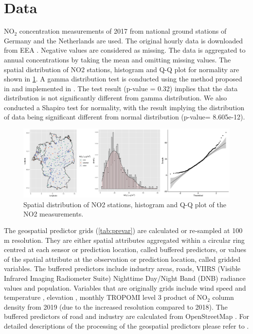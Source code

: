 \documentclass{article}
\begin{document}
 
 
\section{Data}
NO$_2$ concentration measurements of 2017 from national ground stations of Germany and the Netherlands are used. The original hourly data is downloaded from EEA \citep{EEA}. Negative values are considered as missing. The data is aggregated to annual concentrations by taking the mean and omitting missing values. The spatial distribution of NO2 stations, histogram and Q-Q plot for normality are shown in \cref{fig:histqq}. %
A gamma distribution test is conducted using the method proposed in \cite{villasenor2015variance} and implemented in \cite{goft}.  The test result (p-value = 0.32) implies that the data distribution is not significantly different from gamma distribution. We also conducted a Shapiro test for normality, with the result implying the distribution of data being significant different from normal distribution (p-value= 8.605e-12).

\begin{figure}
    \centering
    \includegraphics[scale=0.06]{fig/histqq_NO2.png}
    \caption{Spatial distribution of NO2 stations, histogram and Q-Q plot of the NO2 measurements.}
    \label{fig:histqq}
\end{figure}{}
The geospatial predictor grids (\cref{tab:prevar}) are calculated or re-sampled at 100 m resolution. They are either spatial attributes aggregated within a circular ring centred at each sensor or prediction location, called buffered predictors, or values of the spatial attribute at the observation or prediction location, called gridded variables. The buffered predictors include industry areas, roads, VIIRS (Visible Infrared Imaging Radiometer Suite) Nighttime Day/Night Band (DNB) radiance values \citep[nightlight,][]{nightlight} and population. Variables that are originally grids include wind speed and temperature \citep{dee2011era}, elevation \citep{amante2009etopo1}, monthly TROPOMI level 3 product of NO$_2$ column density  \citep{TROPOMIgee} from 2019 (due to the increased resolution compared to 2018). The buffered predictors of road and industry are calculated from OpenStreetMap  \citep{openstreetmap}. For detailed descriptions of the processing of the geospatial predictors please refer to \cite{luglobal}.   
\end{document}
